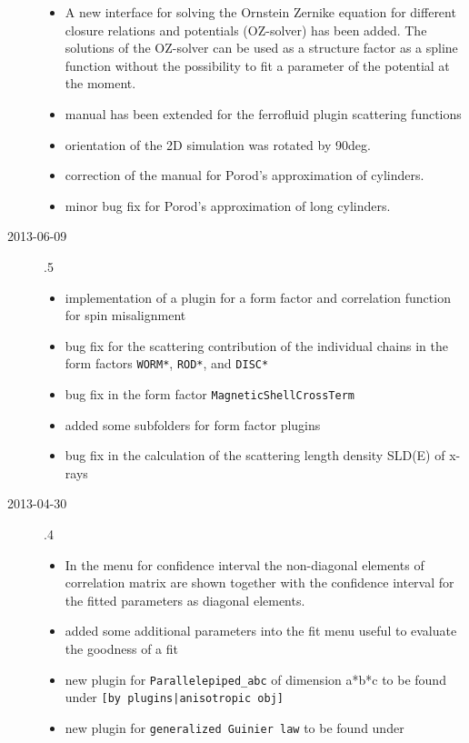 \begin{description}
    \begin{itemize}
      \item A new interface for solving the Ornstein Zernike equation for different
            closure relations and potentials (OZ-solver) has been added. The solutions
            of the OZ-solver can be used as a structure factor as a spline function without the possibility to fit a parameter of the potential at the moment.
      \item manual has been extended for the ferrofluid plugin scattering functions
      \item orientation of the 2D simulation was rotated by 90deg.
      \item correction of the manual for Porod's approximation of cylinders.
      \item minor bug fix for Porod's approximation of long cylinders.
    \end{itemize}
    \item[2013-06-09] .5
    \begin{itemize}
      \item implementation of a plugin for a form factor and correlation function for spin misalignment
      \item  bug fix for the scattering contribution of the individual chains in the form factors \texttt{WORM*}, \texttt{ROD*}, and \texttt{DISC*}
      \item  bug fix in the form factor \texttt{MagneticShellCrossTerm}
      \item added some subfolders for form factor plugins
      \item bug fix in the calculation of the scattering length density SLD(E) of x-rays
    \end{itemize}
    \item[2013-04-30] .4
    \begin{itemize}
      \item In the menu for confidence interval the non-diagonal elements of
            correlation matrix are shown together with the confidence interval
            for the fitted parameters as diagonal elements.
      \item added some additional parameters into the fit menu useful to
            evaluate the goodness of a fit
      \item new plugin for \texttt{Parallelepiped\_abc} of dimension a*b*c to be
            found under \texttt{[by plugins|anisotropic obj]}
      \item new plugin for \texttt{generalized Guinier law} to be found under

\end{itemize}
\end{description}
